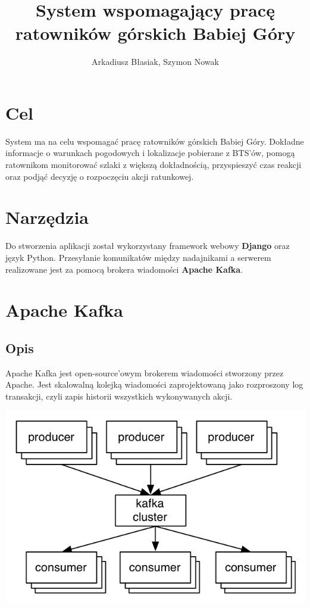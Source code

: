 \documentclass[a4paper,12pt]{article}
\title{System wspomagający pracę ratowników górskich Babiej Góry}
\author{Arkadiusz Błasiak, Szymon Nowak}
\date{}
\begin{document}
\maketitle
\tableofcontents
\newpage
\section{Cel}
System ma na celu wspomagać pracę ratowników górskich Babiej Góry. Dokładne informacje o warunkach pogodowych i lokalizacje pobierane z BTS’ów, pomogą ratownikom monitorować szlaki z większą dokładnością, przyspieszyć czas reakcji oraz podjąć decyzję o rozpoczęciu akcji ratunkowej.
\section{Narzędzia}
Do stworzenia aplikacji został wykorzystany framework webowy \textbf{Django} oraz język Python. Przesyłanie komunikatów między nadajnikami a serwerem realizowane jest za pomocą brokera wiadomości \textbf{Apache Kafka}.
\section{Apache Kafka}
\subsection{Opis}
Apache Kafka jest open-source’owym brokerem wiadomości stworzony przez Apache. Jest skalowalną kolejką wiadomości zaprojektowaną jako rozproszony log transakcji, czyli zapis historii wszystkich wykonywanych akcji.
\begin{center}
\includegraphics[scale=1]{cluster.png}
\end{center}
\end{document}
